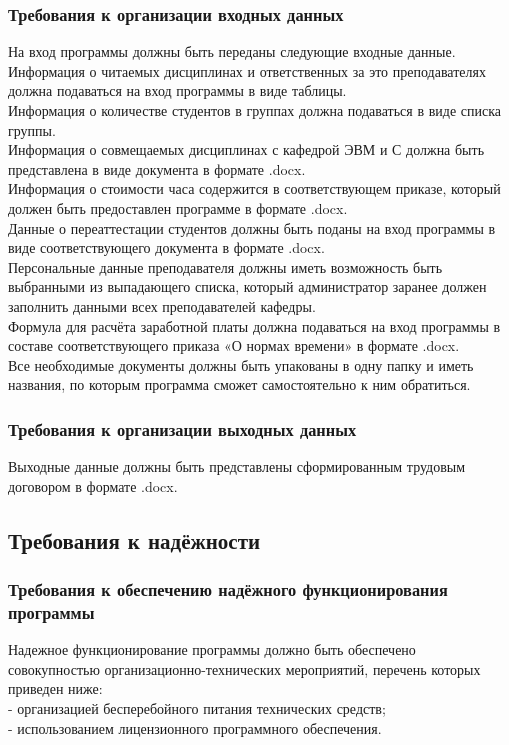 \documentclass[14pt]{extarticle}
\begin{document}
        \subsubsection{Требования к организации входных данных}
        На вход программы должны быть переданы следующие входные данные.\\
        Информация о читаемых дисциплинах и ответственных за это преподавателях должна подаваться на вход программы в виде таблицы.\\
        Информация о количестве студентов в группах должна подаваться в виде списка группы.\\
        Информация о совмещаемых дисциплинах с кафедрой ЭВМ и С должна быть представлена в виде документа в формате .docx.\\
        Информация о стоимости часа содержится в соответствующем приказе, который должен быть предоставлен программе в формате .docx.\\
        Данные о переаттестации студентов должны быть поданы на вход программы в виде соответствующего документа в формате .docx.\\
        Персональные данные преподавателя должны иметь возможность быть выбранными из выпадающего списка, который администратор заранее должен заполнить данными всех преподавателей кафедры.\\
        Формула для расчёта заработной платы должна подаваться на вход программы в составе соответствующего приказа «О нормах времени» в формате .docx.\\
        Все необходимые документы должны быть упакованы в одну папку и иметь названия, по которым программа сможет самостоятельно к ним обратиться.\\
        
        \subsubsection{Требования к организации выходных данных}
        Выходные данные должны быть представлены сформированным трудовым договором в формате .docx.
        
    \subsection{Требования к надёжности}
        \subsubsection{Требования к обеспечению надёжного функционирования программы}
        Надежное функционирование программы должно быть обеспечено совокупностью организационно-технических мероприятий, перечень которых приведен ниже:\\
        -	организацией бесперебойного питания технических средств;\\
        -	использованием лицензионного программного обеспечения.
        
\end{document}
